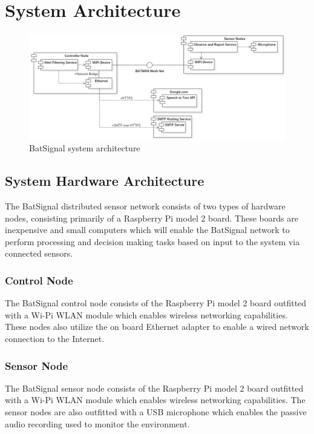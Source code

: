 \documentclass[11pt,a4paper]{article}
\begin{document}
\section{System Architecture}
\begin{figure}[h!]
	\centering
		\includegraphics[width=\textwidth, keepaspectratio=true]{Graphics/SystemArchitecture.png}
	\caption{BatSignal system architecture}
\end{figure}

\subsection{System Hardware Architecture}
The BatSignal distributed sensor network consists of two types of hardware nodes, consisting primarily of a Raspberry Pi model 2 board. These boards are inexpensive and small computers which will enable the BatSignal network to perform processing and decision making tasks based on input to the system via connected sensors. 

\subsubsection{Control Node}
The BatSignal control node consists of the Raspberry Pi model 2 board outfitted with a Wi-Pi WLAN module which enables wireless networking capabilities. These nodes also utilize the on board Ethernet adapter to enable a wired network connection to the Internet.

\subsubsection{Sensor Node}
The BatSignal sensor node consists of the Raspberry Pi model 2 board outfitted with a Wi-Pi WLAN module which enables wireless networking capabilities. The sensor nodes are also outfitted with a USB microphone which enables the passive audio recording used to monitor the environment.
\end{document}
